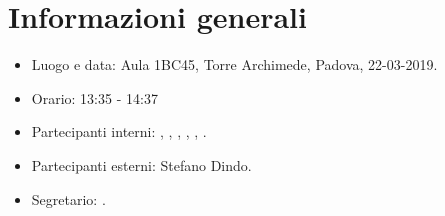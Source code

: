 \section{Informazioni generali}
\begin{itemize}
    \item Luogo e data: Aula 1BC45, Torre Archimede, Padova, 22-03-2019.
    \item Orario: 13:35 - 14:37
    \item Partecipanti interni: \valentin{}, \francesco{}, \daniele{}, \singh{}, \davide{}, \andrea{}.
    \item Partecipanti esterni: Stefano Dindo.
    \item Segretario: \andrea{}.
\end{itemize}